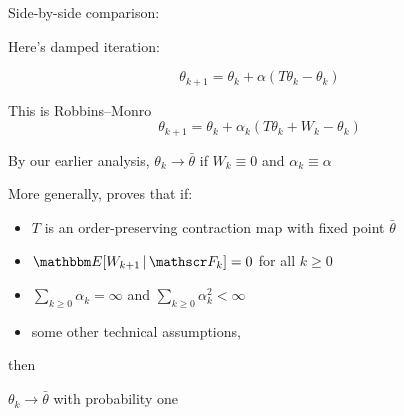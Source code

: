 \documentclass[xcolor=dvipsnames]{beamer}  %
\renewcommand{\geq}{\geqslant}
\newcommand{\1}{\mathbbm 1}
\newcommand{\given}{\, | \,}
\newcommand{\EE}{\mathbbm E}
\newcommand{\fF}{\mathscr F}
\begin{document}
\begin{frame}
    
    Side-by-side comparison:

    \vspace{1em}

    Here's damped iteration:

    \begin{equation*}
        \theta_{k+1} = \theta_k + \alpha (T \theta_k - \theta_k)
    \end{equation*}

    \vspace{1em}
    \vspace{1em}

    This is Robbins--Monro 
    \begin{equation*}
        \theta_{k+1} 
        = \theta_k + \alpha_k ( T \theta_k + W_k - \theta_k )
    \end{equation*}

\end{frame}


\begin{frame}
    
    By our earlier analysis, $\theta_k \to \bar \theta$ if $W_k \equiv 0$ and
    $\alpha_k \equiv \alpha$

    \vspace{0.5em}
    More generally, \cite{tsitsiklis1994asynchronous} proves that if:
    \begin{itemize}
        \item $T$ is an order-preserving contraction map with fixed
            point $\bar \theta$
            \vspace{0.5em}
        \item $\EE [W_{k+1} \given \fF_k] = 0$ for all $k \geq 0$
            \vspace{0.5em}
        \item $\sum_{k \geq 0} \alpha_k = \infty$ and $\sum_{k \geq 0} \alpha_k^2 < \infty$
            \vspace{0.5em}
        \item some other technical assumptions,
    \end{itemize}
    then 
    \begin{center}
        $\theta_k \to \bar \theta$ with probability one
    \end{center}

\end{frame}
\end{document}
